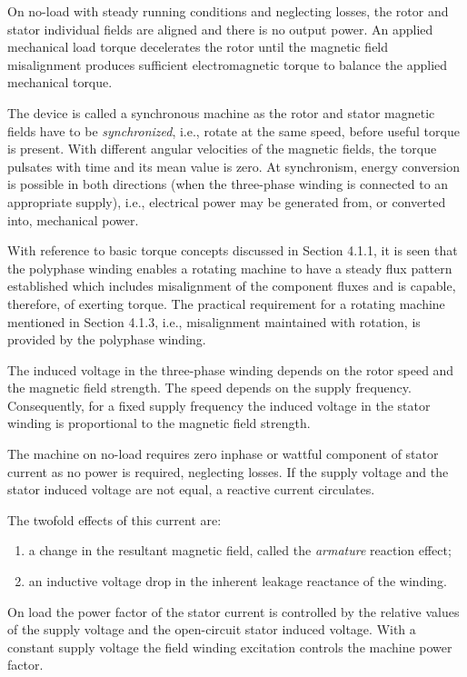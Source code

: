 \documentclass[a4paper,numbers=noenddot,12pt]{scrbook}
\begin{document}
            On no-load with steady running conditions and neglecting losses, the rotor and stator individual fields are aligned and there is no output power. An applied mechanical load torque decelerates the rotor until the magnetic field misalignment produces sufficient electromagnetic torque to balance the applied mechanical torque.

            The device is called a synchronous machine as the rotor and stator magnetic fields have to be \textit{synchronized}, i.e., rotate at the same speed, before useful torque is present. With different angular velocities of the magnetic fields, the torque pulsates with time and its mean value is zero. At synchronism, energy conversion is possible in both directions (when the three-phase winding is connected to an appropriate supply), i.e., electrical power may be generated
            from, or converted into, mechanical power.

            With reference to basic torque concepts discussed in Section 4.1.1, it is seen that the polyphase winding enables a rotating machine to have a steady flux pattern established which includes misalignment of the component fluxes and is capable, therefore, of exerting torque. The practical requirement for a rotating machine mentioned in Section 4.1.3, i.e., misalignment maintained with rotation, is provided by the polyphase winding.

            The induced voltage in the three-phase winding depends on the rotor speed and the magnetic field strength. The speed depends on the supply frequency. Consequently, for a fixed supply frequency the induced voltage in the stator winding is proportional to the magnetic field strength.

            The machine on no-load requires zero inphase or wattful component of stator current as no power is required, neglecting losses. If the supply voltage and the stator induced voltage are not equal, a reactive current circulates.

            The twofold effects of this current are:
            \begin{enumerate}
                \item a change in the resultant magnetic field, called the \textit{armature} reaction effect;
                \item an inductive voltage drop in the inherent leakage reactance of the winding. 
            \end{enumerate}

            On load the power factor of the stator current is controlled by the relative values of the supply voltage and the open-circuit stator induced voltage. With a constant supply voltage the field winding excitation controls the machine power factor.
\end{document}
